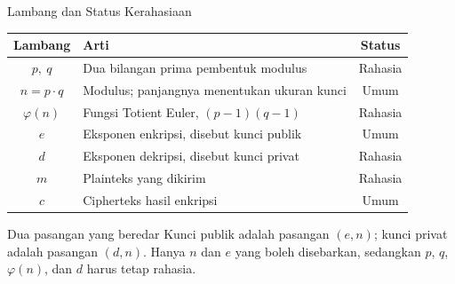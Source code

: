 \documentclass[aspectratio=169,11pt]{beamer}
\begin{document}
\begin{frame}{Lambang dan Status Kerahasiaan}
    \footnotesize
    \begin{tabularx}{\linewidth}{@{}c >{\raggedright\arraybackslash}X c@{}}
        \toprule
        \textbf{Lambang} & \textbf{Arti} & \textbf{Status} \\
        \midrule
        $p,\ q$      & Dua bilangan prima pembentuk modulus & Rahasia \\
        $n = p \cdot q$ & Modulus; panjangnya menentukan ukuran kunci & Umum \\
        $\varphi(n)$ & Fungsi Totient Euler, $(p-1)(q-1)$ & Rahasia \\
        $e$          & Eksponen enkripsi, disebut kunci publik & Umum \\
        $d$          & Eksponen dekripsi, disebut kunci privat & Rahasia \\
        $m$          & Plainteks yang dikirim & Rahasia \\
        $c$          & Cipherteks hasil enkripsi & Umum \\
        \bottomrule
    \end{tabularx}
    \vspace{0.15cm}
    \begin{block}{Dua pasangan yang beredar}
        \footnotesize
        Kunci publik adalah pasangan $(e,n)$; kunci privat adalah pasangan
        $(d,n)$. Hanya $n$ dan $e$ yang boleh disebarkan, sedangkan $p$, $q$,
        $\varphi(n)$, dan $d$ harus tetap rahasia.
    \end{block}
\end{frame}
\end{document}
